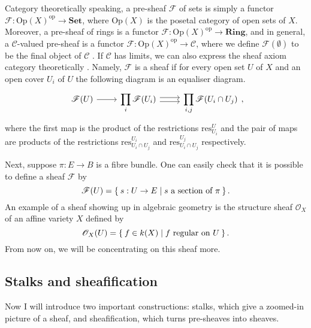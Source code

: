 \begin{bcat}
  Category theoretically speaking, a pre-sheaf $\mathscr{F}$ of sets is
  simply a functor $\mathscr{F}:\text{Op}(X)^{\text{op}}
  \to\mathbf{Set}$, where $\text{Op}(X)$ is the posetal category of
  open sets of $X$. Moreover, a pre-sheaf of rings is a functor
  $\mathscr{F}:\text{Op}(X)^{\text{op}}\to \mathbf{Ring}$, and in general,
  a $\mathscr{C}$-valued pre-sheaf is a functor
  $\mathscr{F}:\text{Op}(X)^{\text{op}}\to\mathscr{C}$, where we define
  $\mathscr{F}(\emptyset)$ to be the final object of $\mathscr{C}$
  \cite{vakil}. If $\mathscr{C}$ has limits, we can also express the sheaf
  axiom category theoretically \cite{maclane}. Namely, $\mathscr{F}$ is a
  sheaf if for every open set $U$ of $X$ and an open cover $U_{i}$ of $U$ the
  following diagram is an equaliser diagram.
  \begin{equation}\label{diag:sheaf_eq}\begin{tikzcd}
      \mathscr{F}(U)\rar
      & \displaystyle\prod_{i}\mathscr{F}(U_{i})\rar[shift left]\rar[shift right]
      & \displaystyle\prod_{i,j}\mathscr{F}(U_{i}\cap U_{j})
    \end{tikzcd},\end{equation}
  where the first map is the product of the restrictions
  $\text{res}_{U_{i}}^{U}$ and the pair of maps are products of the
  restrictions $\text{res}_{U_{i}\cap U_{j}}^{U_{i}}$ and
  $\text{res}_{U_{i}\cap U_{j}}^{U_{j}}$ respectively.
\end{bcat}

Next, suppose $\pi: E\to B$ is a fibre bundle. One can easily check that
it is possible to define a sheaf $\mathscr{F}$ by
\[
  \mathscr{F}(U) = \Set{s:U\to E\mid s\text{ a section of }\pi}.
\]
An example of a sheaf showing up in algebraic geometry is the structure
sheaf $\mathscr{O}_{X}$ of an affine variety $X$ defined by
\[
  \mathscr{O}_{X}(U)=\Set{f\in k(X)\mid f\text{ regular on } U}.
\]
From now on, we will be concentrating on this sheaf more.

\subsection{Stalks and sheafification}
Now I will introduce two important constructions: stalks, which give a
zoomed-in picture of a sheaf, and sheafification, which turns pre-sheaves
into sheaves.

